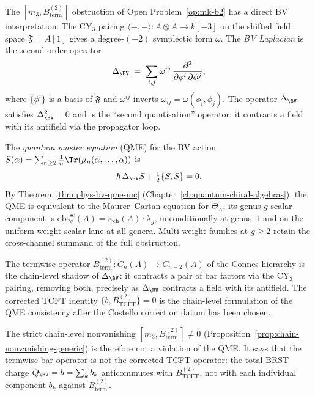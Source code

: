 \begin{remark}
\label{rem:phys-bv-laplacian-m3b2}
The $[m_3, B^{(2)}_{\mathrm{term}}]$ obstruction of Open Problem~\ref{op:mk-b2} has a direct BV interpretation. The CY$_3$ pairing $\langle -,-\rangle\colon A\otimes A\to k[-3]$ on the shifted field space $\mathfrak{F} = A[1]$ gives a degree-$(-2)$ symplectic form $\omega$. The \emph{BV Laplacian} is the second-order operator
\[
 \Delta_{\BV} \;=\; \sum_{i,j} \omega^{ij}\,\frac{\partial^2}{\partial\phi^i\,\partial\phi^j},
\]
where $\{\phi^i\}$ is a basis of $\mathfrak{F}$ and $\omega^{ij}$ inverts $\omega_{ij} = \omega(\phi_i,\phi_j)$. The operator $\Delta_{\BV}$ satisfies $\Delta_{\BV}^2 = 0$ and is the ``second quantisation'' operator: it contracts a field with its antifield via the propagator loop.

The \emph{quantum master equation} (QME) for the BV action $S(\alpha) = \sum_{n\geq 2}\frac{1}{n}\Tr(\mu_n(\alpha,\ldots,\alpha))$ is
\begin{equation}
\label{eq:m3b2-qme}
 \hbar\,\Delta_{\BV} S + \tfrac{1}{2}\{S,S\} = 0.
\end{equation}
By Theorem~\ref{thm:phys-bv-qme-mc} (Chapter~\ref{ch:quantum-chiral-algebras}), the QME is equivalent to the Maurer--Cartan equation for $\Theta_A$; its genus-$g$ scalar component is $\mathrm{obs}^{\mathrm{sc}}_g(A)=\kappa_{\mathrm{ch}}(A)\cdot\lambda_g$, unconditionally at genus~$1$ and on the uniform-weight scalar lane at all genera. Multi-weight families at $g\geq2$ retain the cross-channel summand of the full obstruction.

The termwise operator
$B^{(2)}_{\mathrm{term}}\colon C_n(A)\to C_{n-2}(A)$ of the
Connes hierarchy is the chain-level shadow of $\Delta_{\BV}$: it
contracts a pair of bar factors via the CY$_3$ pairing, removing
both, precisely as $\Delta_{\BV}$ contracts a field with its
antifield.  The corrected TCFT identity
$\{b,B^{(2)}_{\mathrm{TCFT}}\}=0$ is the chain-level formulation
of the QME consistency after the Costello correction datum has
been chosen.

The strict chain-level nonvanishing
$[m_3, B^{(2)}_{\mathrm{term}}] \neq 0$
(Proposition~\ref{prop:chain-nonvanishing-generic}) is therefore
not a violation of the QME.  It says that the termwise bar
operator is not the corrected TCFT operator: the total BRST charge
$Q_{\BV}=b=\sum_k b_k$ anticommutes with
$B^{(2)}_{\mathrm{TCFT}}$, not with each individual component
$b_k$ against $B^{(2)}_{\mathrm{term}}$.
\end{remark}
